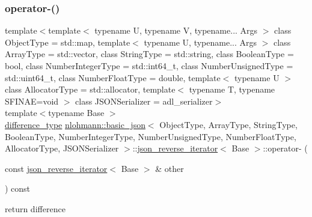 \subsubsection{\texorpdfstring{operator-\/()}{operator-()}\hspace{0.1cm}{\footnotesize\ttfamily [2/2]}}
{\footnotesize\ttfamily template$<$template$<$ typename U, typename V, typename... Args $>$ class Object\+Type = std\+::map, template$<$ typename U, typename... Args $>$ class Array\+Type = std\+::vector, class String\+Type  = std\+::string, class Boolean\+Type  = bool, class Number\+Integer\+Type  = std\+::int64\+\_\+t, class Number\+Unsigned\+Type  = std\+::uint64\+\_\+t, class Number\+Float\+Type  = double, template$<$ typename U $>$ class Allocator\+Type = std\+::allocator, template$<$ typename T, typename S\+F\+I\+N\+A\+E=void $>$ class J\+S\+O\+N\+Serializer = adl\+\_\+serializer$>$ \\
template$<$typename Base $>$ \\
\hyperlink{classnlohmann_1_1basic__json_afe7c1303357e19cea9527af4e9a31d8f}{difference\+\_\+type} \hyperlink{classnlohmann_1_1basic__json}{nlohmann\+::basic\+\_\+json}$<$ Object\+Type, Array\+Type, String\+Type, Boolean\+Type, Number\+Integer\+Type, Number\+Unsigned\+Type, Number\+Float\+Type, Allocator\+Type, J\+S\+O\+N\+Serializer $>$\+::\hyperlink{classnlohmann_1_1basic__json_1_1json__reverse__iterator}{json\+\_\+reverse\+\_\+iterator}$<$ Base $>$\+::operator-\/ (\begin{DoxyParamCaption}\item[{const \hyperlink{classnlohmann_1_1basic__json_1_1json__reverse__iterator}{json\+\_\+reverse\+\_\+iterator}$<$ Base $>$ \&}]{other }\end{DoxyParamCaption}) const\hspace{0.3cm}{\ttfamily [inline]}}



return difference 

\mbox{\label{classnlohmann_1_1basic__json_1_1json__reverse__iterator_abc37aca3fee5d832f254c94e1cd2f216}} 
